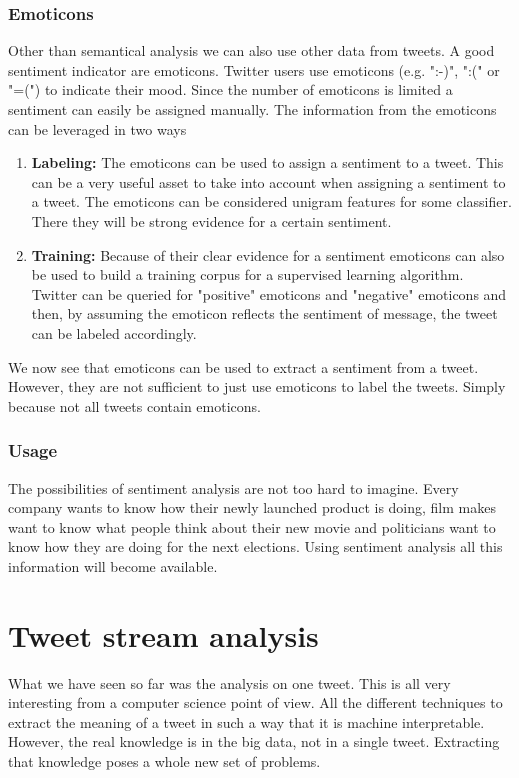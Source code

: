 \documentclass{article}
\begin{document}
\subsubsection{Emoticons}
Other than semantical analysis we can also use other data from tweets. A good sentiment indicator are emoticons. Twitter users use emoticons (e.g. ":-)", ":(" or "=(") to indicate their mood.\cite{twitterSentiment} Since the number of emoticons is limited a sentiment can easily be assigned manually. The information from the emoticons can be leveraged in two ways
\begin{enumerate}
\item \textbf{Labeling:} The emoticons can be used to assign a sentiment to a tweet. This can be a very useful asset to take into account when assigning a sentiment to a tweet. The emoticons can be considered unigram features for some classifier. There they will be strong evidence for a certain sentiment.
\item \textbf{Training:} Because of their clear evidence for a sentiment emoticons can also be used to build a training corpus for a supervised learning algorithm. Twitter can be queried for "positive" emoticons and "negative" emoticons and then, by assuming the emoticon reflects the sentiment of message, the tweet can be labeled accordingly.\cite{moodLens} 
\end{enumerate}
We now see that emoticons can be used to extract a sentiment from a tweet. However, they are not sufficient to just use emoticons to label the tweets. Simply because not all tweets contain emoticons.
\subsubsection{Usage}
The possibilities of sentiment analysis are not too hard to imagine. Every company wants to know how their newly launched product is doing, film makes want to know what people think about their new movie and politicians want to know how they are doing for the next elections. Using sentiment analysis all this information will become available\cite{machineLearning}. 

\section{Tweet stream analysis}
What we have seen so far was the analysis on one tweet. This is all very interesting from a computer science point of view. All the different techniques to extract the meaning of a tweet in such a way that it is machine interpretable. However, the real knowledge is in the big data, not in a single tweet. Extracting that knowledge poses a whole new set of problems.
\end{document}
